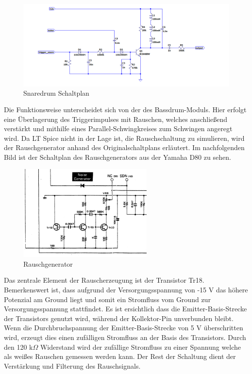 \begin{figure}[H]
    \centering
    \includegraphics[width=1\textwidth]{Images/SD_Noise.png}
    \caption[Snaredrum Schaltplan]{Snaredrum Schaltplan\cite{ServiceManual}}
    \label{fig:SD_noise}
\end{figure}
Die Funktionsweise unterscheidet sich von der des Bassdrum-Moduls. Hier erfolgt eine Überlagerung des Triggerimpulses mit Rauschen, welches anschließend verstärkt und mithilfe eines Parallel-Schwingkreises zum Schwingen angeregt wird. Da LT Spice nicht in der Lage ist, die Rauschschaltung zu simulieren, wird der Rauschgenerator anhand des Originalschaltplans erläutert. Im nachfolgenden Bild ist der Schaltplan des Rauschgenerators aus der Yamaha D80 zu sehen.

\begin{figure}[H]
    \centering
    \includegraphics[width=0.6\textwidth]{Images/Noise Generator.png}
    \caption[Rauschgenerator]{Rauschgenerator\cite{ServiceManual}}
    \label{fig:Rauschgenerator}
\end{figure}

Das zentrale Element der Rauscherzeugung ist der Transistor Tr18. Bemerkenswert ist, dass aufgrund der Versorgungsspannung von -15 V das höhere Potenzial am Ground liegt und somit ein Stromfluss vom Ground zur Versorgungsspannung stattfindet. Es ist ersichtlich dass die Emitter-Basis-Strecke der Transistors genutzt wird, während der Kollektor-Pin unverbunden bleibt. Wenn die Durchbruchspannung der Emitter-Basis-Strecke von 5 V überschritten wird, erzeugt dies einen zufälligen Stromfluss an der Basis des Transistors. Durch den 120 k$\Omega$ Widerstand wird der zufällige Stromfluss zu einer Spannung welche als weißes Rauschen gemessen werden kann. Der Rest der Schaltung dient der Verstärkung und Filterung des Rauschsignals.

